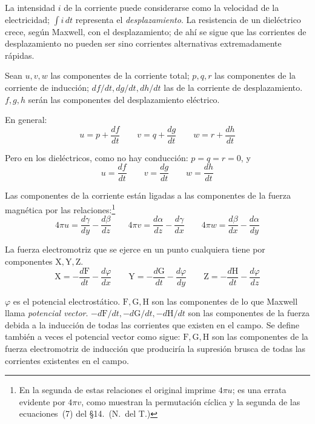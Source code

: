 La intensidad $i$ de la corriente puede considerarse como la velocidad de
la electricidad; $\int i\,dt$ representa el \emph{desplazamiento}. La
resistencia de un dieléctrico crece, según Maxwell, con el desplazamiento;
de ahí se sigue que las corrientes de desplazamiento no pueden ser sino
corrientes alternativas extremadamente rápidas.

Sean $u,v,w$ las componentes de la corriente total; $p,q,r$ las componentes
de la corriente de inducción; $df/dt,dg/dt,dh/dt$ las de la corriente de
desplazamiento. $f,g,h$ serán las componentes del desplazamiento eléctrico.

En general:
\begin{equation}
u=p+\frac{df}{dt}\qquad v=q+\frac{dg}{dt}\qquad w=r+\frac{dh}{dt}
\end{equation}

Pero en los dieléctricos, como no hay conducción: $p=q=r=0$, y
\begin{equation}
u=\frac{df}{dt}\qquad v=\frac{dg}{dt}\qquad w=\frac{dh}{dt}
\end{equation}

Las componentes de la corriente están ligadas a las componentes de la
fuerza magnética por las relaciones:\footnote{En la segunda de estas
relaciones el original imprime $4\pi u$; es una errata evidente por
$4\pi v$, como muestran la permutación cíclica y la segunda de las
ecuaciones~(7) del §14.~(N.~del T.)}
\begin{equation}
4\pi u=\frac{d\gamma}{dy}-\frac{d\beta}{dz}\qquad
4\pi v=\frac{d\alpha}{dz}-\frac{d\gamma}{dx}\qquad
4\pi w=\frac{d\beta}{dx}-\frac{d\alpha}{dy}
\end{equation}

La fuerza electromotriz que se ejerce en un punto cualquiera tiene por
componentes $\mathrm{X},\mathrm{Y},\mathrm{Z}$.
\begin{equation}
\mathrm{X}=-\frac{d\mathrm{F}}{dt}-\frac{d\varphi}{dx}\qquad
\mathrm{Y}=-\frac{d\mathrm{G}}{dt}-\frac{d\varphi}{dy}\qquad
\mathrm{Z}=-\frac{d\mathrm{H}}{dt}-\frac{d\varphi}{dz}
\end{equation}

$\varphi$ es el potencial electrostático. $\mathrm{F},\mathrm{G},\mathrm{H}$
son las componentes de lo que Maxwell llama \emph{potencial vector}.
$-d\mathrm{F}/dt,-d\mathrm{G}/dt,-d\mathrm{H}/dt$ son las componentes de la
fuerza debida a la inducción de todas las corrientes que existen en el
campo. Se define también a veces el potencial vector como sigue:
$\mathrm{F},\mathrm{G},\mathrm{H}$ son las componentes de la fuerza
electromotriz de inducción que produciría la supresión brusca de todas las
corrientes existentes en el campo.

